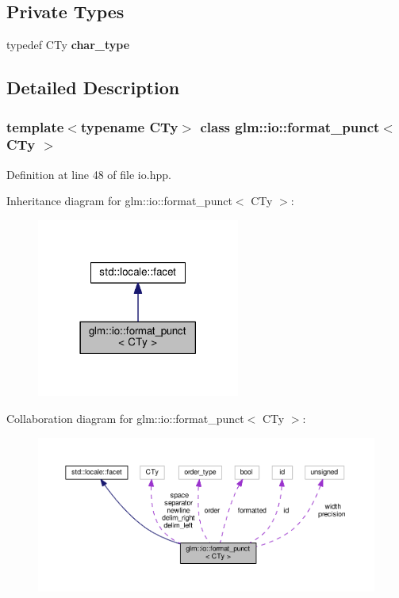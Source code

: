 \subsection*{Private Types}
\begin{DoxyCompactItemize}
\item 
\mbox{\label{classglm_1_1io_1_1format__punct_ae94c42484a4c5258ad7b2f0f029efdf3}} 
typedef C\+Ty {\bfseries char\+\_\+type}
\end{DoxyCompactItemize}


\subsection{Detailed Description}
\subsubsection*{template$<$typename C\+Ty$>$\newline
class glm\+::io\+::format\+\_\+punct$<$ C\+Ty $>$}



Definition at line 48 of file io.\+hpp.



Inheritance diagram for glm\+:\+:io\+:\+:format\+\_\+punct$<$ C\+Ty $>$\+:
\nopagebreak
\begin{figure}[H]
\begin{center}
\leavevmode
\includegraphics[width=189pt]{d3/daa/classglm_1_1io_1_1format__punct__inherit__graph}
\end{center}
\end{figure}


Collaboration diagram for glm\+:\+:io\+:\+:format\+\_\+punct$<$ C\+Ty $>$\+:
\nopagebreak
\begin{figure}[H]
\begin{center}
\leavevmode
\includegraphics[width=350pt]{d0/d6f/classglm_1_1io_1_1format__punct__coll__graph}
\end{center}
\end{figure}


